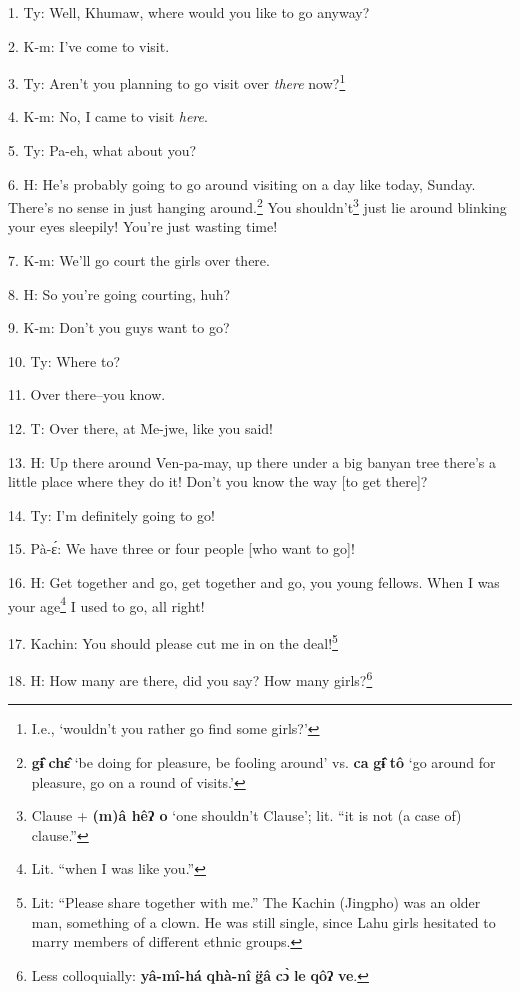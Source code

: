 \setcounter{footnote}{0}

1. Ty: Well, Khumaw, where would you like to go anyway?

2. K-m: I've come to visit.

3. Ty: Aren't you planning to go visit over \textit{there} now?\footnote{I.e., `wouldn't you rather go find some girls?'}

4. K-m: No, I came to visit \textit{here}.

5. Ty: Pa-eh, what about you?

6. H: He's probably going to go around visiting on a day like today, Sunday. There's
no sense in just hanging around.\footnote{\textbf{gɨ̂} \textbf{chɛ̂} `be doing for pleasure, be fooling around' vs. \textbf{ca} \textbf{gɨ̂} \textbf{tô} `go around for pleasure, go on a round of visits.'} You shouldn't\footnote{Clause + \textbf{(m)â hêʔ o} `one shouldn't Clause'; lit. ``it is not (a case of) clause.''} just lie around blinking
your eyes sleepily! You're just wasting time!

7. K-m: We'll go court the girls over there.

8. H: So you're going courting, huh?

9. K-m: Don't you guys want to go?

10. Ty: Where to?

11. Over there--you know.

12. T: Over there, at Me-jwe, like you said!

13. H: Up there around Ven-pa-may, up there under a big banyan tree there's a little
place where they do it! Don't you know the way [to get there]?

14. Ty: I'm definitely going to go!

15. Pà-ɛ́: We have three or four people [who want to go]!

16. H: Get together and go, get together and go, you young fellows. When I was your
age\footnote{Lit. ``when I was like you.''} I used to go, all right!

17. Kachin: You should please cut me in on the deal!\footnote{Lit: ``Please share together with me.'' The Kachin (Jingpho) was an older man, something of a clown. He was still single, since Lahu girls hesitated to marry members of different ethnic groups.}


18. H: How many are there, did you say? How many girls?\footnote{Less colloquially: \textbf{yâ-mî-há} \textbf{qhà-nî} \textbf{g̈â} \textbf{cɔ̀} \textbf{le} \textbf{qôʔ} \textbf{ve}.}

